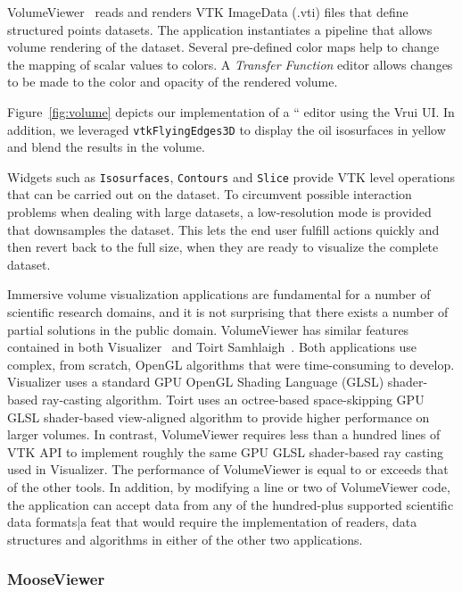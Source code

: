 VolumeViewer~\cite{VolumeViewer} reads and renders VTK ImageData (.vti) files that define structured points datasets.  The application instantiates a pipeline that allows volume rendering of the dataset. Several pre-defined color maps help to change the mapping of scalar values to colors. A \textit{Transfer Function} editor allows changes to be made to the color and opacity of the rendered volume.

Figure~\ref{fig:volume} depicts our implementation of a `` editor using the Vrui UI. In addition, we leveraged \texttt{vtkFlyingEdges3D} to display the oil isosurfaces in yellow and blend the results in the volume.

Widgets such as \texttt{Isosurfaces}, \texttt{Contours} and \texttt{Slice} provide VTK level operations that can be carried out on the dataset. To circumvent possible interaction problems when dealing with large datasets, a low-resolution mode is provided that downsamples the dataset. This lets the end user fulfill actions quickly and then revert back to the full size, when they are ready to visualize the complete dataset.

Immersive volume visualization applications are fundamental for a number of scientific research domains, and it is not surprising that there exists a number of partial solutions in the public domain. VolumeViewer has similar features contained in both Visualizer~\cite{Billen:2008} and Toirt Samhlaigh~\cite{O'Leary:2008}. Both applications use complex, from scratch, OpenGL algorithms that were time-consuming to develop. Visualizer uses a standard GPU OpenGL Shading Language (GLSL) shader-based ray-casting algorithm. Toirt uses an octree-based space-skipping GPU GLSL shader-based view-aligned algorithm to provide higher performance on larger volumes. In contrast, VolumeViewer requires less than a hundred lines of VTK API to implement roughly the same GPU GLSL shader-based ray casting used in Visualizer. The performance of VolumeViewer is equal to or exceeds that of the other tools. In addition, by modifying a line or two of VolumeViewer code, the application can accept data from any of the hundred-plus supported scientific data formats|a feat that would require the implementation of readers, data structures and algorithms in either of the other two applications.

\subsubsection{MooseViewer}

